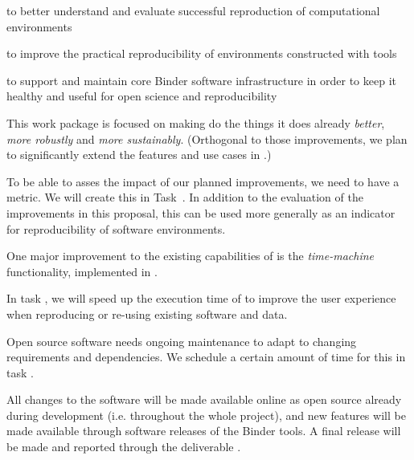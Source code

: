 
\begin{workpackage}[
  id=reproducibility,
  wphases={0-6!1.14,6-24!0.73,24-36!0.1},
  title=Improving robustness of reproducibility tools,
  short=Improving robustness,
  lead=QS,
  SRLRM=23,
  UIORM=0,
  MPRM=2,
  QSRM=12,
  swsites,
]
\begin{wpobjectives}
  \begin{compactitem}
    \item to better understand and evaluate successful reproduction of computational environments
    \item to improve the practical reproducibility of environments constructed
      with \TheProject tools
    \item to support and maintain core Binder software infrastructure in order to keep it healthy
         and useful for open science and reproducibility
 \end{compactitem}
\end{wpobjectives}

\begin{wpdescription}

This work package is focused on making \repotodocker{} do the things it does
already \emph{better}, \emph{more robustly} and \emph{more sustainably}.
(Orthogonal to those improvements, we plan to significantly extend the
\repotodocker{} features and use cases in .)

To be able to asses the impact of our planned improvements, we need to have a
metric. We will create this in Task~.
In addition to the evaluation of the improvements in this proposal, this
can be used more generally as an indicator for reproducibility of software
environments.

One major improvement to the existing capabilities of \repotodocker{} is the
\emph{time-machine} functionality,
implemented in .

In task , we will speed up the execution time of
\repotodocker{} to improve the user experience when reproducing or re-using
existing software and data.

Open source software needs ongoing maintenance to adapt to changing requirements
and dependencies. We schedule a certain amount of time for this in task
.

All changes to the software will be made available online as open source already during development
(i.e. throughout the whole project), and new features will be made available
through software releases of the Binder tools. A final release will be made and
reported through the deliverable .


\end{wpdescription}
\end{workpackage}
